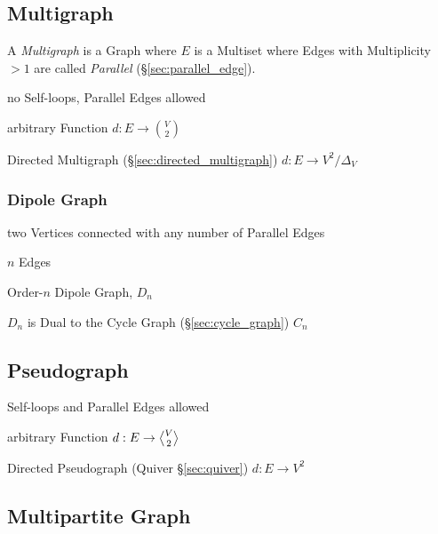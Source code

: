 \subsection{Multigraph}\label{sec:multigraph}

A \emph{Multigraph} is a Graph where $E$ is a Multiset where Edges
with Multiplicity $>1$ are called \emph{Parallel}
(\S\ref{sec:parallel_edge}).

no Self-loops, Parallel Edges allowed

arbitrary Function $d : E \rightarrow {V \choose 2}$

Directed Multigraph (\S\ref{sec:directed_multigraph}) $d : E
\rightarrow V^2 / \Delta_V$



\subsubsection{Dipole Graph}\label{sec:dipole_graph}

two Vertices connected with any number of Parallel Edges

$n$ Edges

Order-$n$ Dipole Graph, $D_n$

$D_n$ is Dual to the Cycle Graph (\S\ref{sec:cycle_graph}) $C_n$



\subsection{Pseudograph}\label{sec:pseudograph}

Self-loops and Parallel Edges allowed

arbitrary Function $d : E \rightarrow \angleover{V}{2}$

Directed Pseudograph (Quiver \S\ref{sec:quiver}) $d : E \rightarrow
V^2$



\subsection{Multipartite Graph}\label{sec:multipartite_graph}

